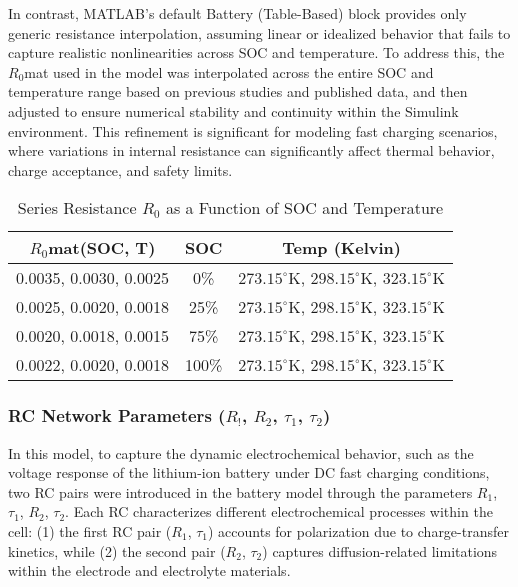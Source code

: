 \documentclass[conference]{IEEEtran}
\begin{document}
In contrast, MATLAB's default Battery (Table-Based) block provides only generic resistance interpolation, assuming linear or idealized behavior that fails to capture realistic nonlinearities across SOC and temperature. To address this, the $R_0$mat used in the model was interpolated across the entire SOC and temperature range based on previous studies and published data, and then adjusted to ensure numerical stability and continuity within the Simulink environment. This refinement is significant for modeling fast charging scenarios, where variations in internal resistance can significantly affect thermal behavior, charge acceptance, and safety limits.


\begin{table}[H]
\centering
\caption{Series Resistance $R_0$ as a Function of SOC and Temperature}
\begin{tabular}{|c|c|c|}
\hline
\textbf{$R_0$mat(SOC, T)} & \textbf{SOC} & \textbf{Temp (Kelvin)} \\
\hline
0.0035, 0.0030, 0.0025 & 0\% & $273.15^\circ$K, $298.15^\circ$K, $323.15^\circ$K\\
0.0025, 0.0020, 0.0018 & 25\% & $273.15^\circ$K, $298.15^\circ$K, $323.15^\circ$K \\
0.0020, 0.0018, 0.0015 & 75\% & $273.15^\circ$K, $298.15^\circ$K, $323.15^\circ$K \\
0.0022, 0.0020, 0.0018 & 100\% & $273.15^\circ$K, $298.15^\circ$K, $323.15^\circ$K  \\
\hline
\end{tabular}
\end{table}

\subsubsection {\textbf{RC Network Parameters ($R_!$, $R_2$, $\tau_1$, $\tau_2$)}}

In this model, to capture the dynamic electrochemical behavior, such as the voltage response of the lithium-ion battery under DC fast charging conditions, two RC pairs were introduced in the battery model through the parameters $R_1$, $\tau_1$, $R_2$, $\tau_2$. Each RC characterizes different electrochemical processes within the cell: (1) the first RC pair ($R_1$, $\tau_1$) accounts for polarization due to charge-transfer kinetics, while (2) the second pair ($R_2$, $\tau_2$) captures diffusion-related limitations within the electrode and electrolyte materials.
\end{document}
